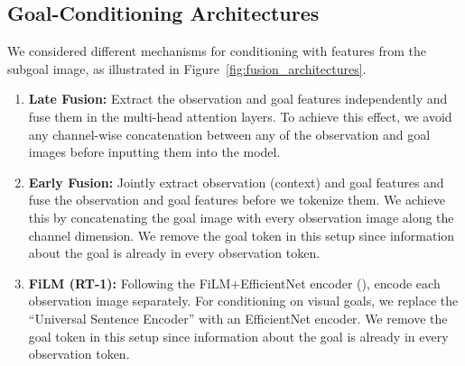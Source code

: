 \subsection{Goal-Conditioning Architectures}

We considered different mechanisms for conditioning \ModelName with features from the subgoal image, as illustrated in Figure~\ref{fig:fusion_architectures}. %

\begin{enumerate}
    \item \textbf{Late Fusion:} Extract the observation and goal features independently and fuse them in the multi-head attention layers. To achieve this effect, we avoid any channel-wise concatenation between any of the observation and goal images before inputting them into the model.
    \item \textbf{Early Fusion:} Jointly extract observation (context) and goal features and fuse the observation and goal features before we tokenize them. We achieve this by concatenating the goal image with every observation image along the channel dimension. We remove the goal token in this setup since information about the goal is already in every observation token.
    \item \textbf{FiLM (RT-1):} Following the FiLM+EfficientNet encoder (\citet{brohan2022rt1}), encode each observation image separately. For conditioning on visual goals, we replace the ``Universal Sentence Encoder'' with an EfficientNet encoder. We remove the goal token in this setup since information about the goal is already in every observation token.
\end{enumerate}

